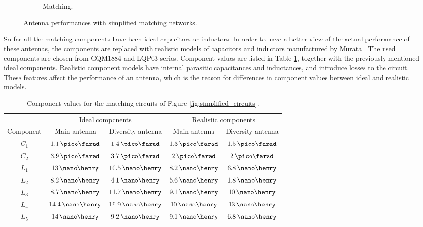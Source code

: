 \begin{figure}[H]
\begin{subfigure}[b]{0.49\textwidth}
        \caption{Matching.}
        \label{fig:div_ideal_match}
    \end{subfigure}
    \caption{Antenna performances with simplified matching networks.}
    \label{fig:div_eff}
    \vspace{-10pt}
\end{figure}

So far all the matching components have been ideal capacitors or inductors. In order to have a better view of the actual performance of these antennas, the components are replaced with realistic models of capacitors and inductors manufactured by Murata \cite{murata}. The used components are chosen from GQM1884 \cite{murata_c} and LQP03 \cite{murata_l} series. Component values are listed in Table \ref{tab:match}, together with the previously mentioned ideal components. Realistic component models have internal parasitic capacitances and inductances, and introduce losses to the circuit. These features affect the performance of an antenna, which is the reason for differences in component values between ideal and realistic models.
\begin{table}[H]
    \centering
    \caption{Component values for the matching circuits of Figure \ref{fig:simplified_circuits}.}
    \label{tab:match}
    \begin{tabular}{|c|c|c|c|c|}
        \hline
         & \multicolumn{2}{|c|}{Ideal components} & \multicolumn{2}{|c|}{Realistic components} \\
         \cline{2-5}
         Component & Main antenna & Diversity antenna & Main antenna & Diversity antenna\\
         \hline
         $C_1$ & $1.1\,\pico\farad$ & $1.4\,\pico\farad$ & $1.3\,\pico\farad$ & $1.5\,\pico\farad$\\
         \hline
         $C_2$ & $3.9\,\pico\farad$ & $3.7\,\pico\farad$ & $2\,\pico\farad$ & $2\,\pico\farad$\\
         \hline
         $L_1$ & $13\,\nano\henry$ & $10.5\,\nano\henry$ & $8.2\,\nano\henry$ & $6.8\,\nano\henry$\\
         \hline
         $L_2$ & $8.2\,\nano\henry$ & $4.1\,\nano\henry$ & $5.6\,\nano\henry$ & $1.8\,\nano\henry$\\
         \hline
         $L_3$ & $8.7\,\nano\henry$ & $11.7\,\nano\henry$ & $9.1\,\nano\henry$ & $10\,\nano\henry$\\
         \hline
         $L_4$ & $14.4\,\nano\henry$ & $19.9\,\nano\henry$ & $10\,\nano\henry$ & $13\,\nano\henry$\\
         \hline
         $L_5$ & $14\,\nano\henry$ & $9.2\,\nano\henry$ & $9.1\,\nano\henry$ & $6.8\,\nano\henry$\\
         \hline
    \end{tabular}
\end{table}

